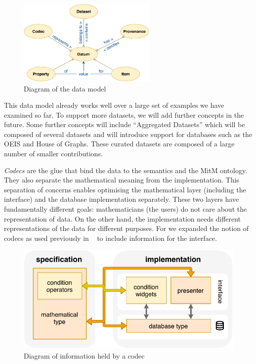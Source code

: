 \begin{figure}[ht]
  \includegraphics[width=0.6\textwidth]{data-model.pdf}
  \caption{Diagram of the \dmh data model}\label{fig:data-model}
\end{figure}

This data model already works well over a large set of examples we have examined so far.
To support more datasets, we will add further concepts in the future.
Some further concepts will include ``Aggregated Datasets'' which will be composed of several datasets and will
introduce support for databases such as the OEIS and House of Graphs.
These curated datasets are composed of a large number of smaller contributions.

\medskip

\emph{Codecs} are the glue that bind the data to the semantics and the MitM ontology.
They also separate the mathematical meaning from the implementation.
This separation of concerns enables optimising the mathematical layer (including the interface)
and the database implementation separately.
These two layers have fundamentally different goals: 
mathematicians (the users) do not care about the representation of data.
On the other hand, the implementation needs 
different representations of the data for different purposes.
For \dmh we expanded the notion of codecs as used previously in \pn~\cite{WieKohRab:vtuimkb17}
to include information for the interface.
\begin{figure}[ht]
  \includegraphics{codec.pdf}
  \caption{Diagram of information held by a \dmh codec}\label{fig:codec}
\end{figure}


